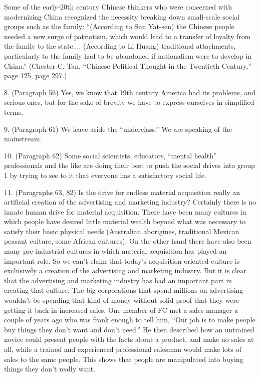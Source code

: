Some of the early-20th century Chinese thinkers who were concerned with modernizing China recognized the necessity breaking down small-scale social groups such as the family: “(According to Sun Yat-sen) the Chinese people needed a new surge of patriotism, which would lead to a transfer of loyalty from the family to the state.... (According to Li Huang) traditional attachments, particularly to the family had to be abandoned if nationalism were to develop in China.” (Chester C. Tan, “Chinese Political Thought in the Twentieth Century,” page 125, page 297.)

8. (Paragraph 56) Yes, we know that 19th century America had its problems, and serious ones, but for the sake of brevity we have to express ourselves in simplified terms.

9. (Paragraph 61) We leave aside the “underclass.” We are speaking of the mainstream.

10. (Paragraph 62) Some social scientists, educators, “mental health” professionals and the like are doing their best to push the social drives into group 1 by trying to see to it that everyone has a satisfactory social life.

11. (Paragraphs 63, 82) Is the drive for endless material acquisition really an artificial creation of the advertising and marketing industry? Certainly there is no innate human drive for material acquisition. There have been many cultures in which people have desired little material wealth beyond what was necessary to satisfy their basic physical needs (Australian aborigines, traditional Mexican peasant culture, some African cultures). On the other hand there have also been many pre-industrial cultures in which material acquisition has played an important role. So we can’t claim that today’s acquisition-oriented culture is exclusively a creation of the advertising and marketing industry. But it is clear that the advertising and marketing industry has had an important part in creating that culture. The big corporations that spend millions on advertising wouldn’t be spending that kind of money without solid proof that they were getting it back in increased sales. One member of FC met a sales manager a couple of years ago who was frank enough to tell him, “Our job is to make people buy things they don’t want and don’t need.” He then described how an untrained novice could present people with the facts about a product, and make no sales at all, while a trained and experienced professional salesman would make lots of sales to the same people. This shows that people are manipulated into buying things they don’t really want.

